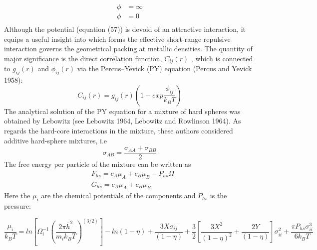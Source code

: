 \documentclass[12pt]{article}
\newcommand*{\1}{\hspace{1pt}}
\begin{document}
\begin{align}
        \phi & = \infty \tag*{($r<0$)}\\
        \phi & = 0  \tag*{($r>0$)}\\       
\end{align}
Although the potential (equation (57)) is devoid of an attractive interaction, it equips a 
useful insight into which forms the effective short-range repulsive interaction governs the 
geometrical packing at metallic densities. The quantity of major significance is the direct
correlation function, $C_{ij}(r)$ , which is connected to $g_{ij}(r)$ and $\phi_{ij}(r)$ via the Percus–Yevick
(PY) equation (Percus and Yevick 1958):
    \begin{equation}
        C_{ij}(r) = g_{ij}(r)\left(1 - exp\frac{\phi_{ij}}{k_{B}T}\right)          \tag*{(i , j = A , B)}
    \end{equation}
The analytical solution of the PY equation for a mixture of hard spheres was obtained by 
Lebowitz (see Lebowitz 1964, Lebowitz and Rowlinson 1964). As regards the hard-core 
interactions in the mixture, these authors considered additive hard-sphere mixtures, i.e
    \begin{equation}
        \sigma_{AB} = \frac{\sigma_{AA} + \sigma_{BB} }{2}
    \end{equation}
The free energy per particle of the mixture can be written as
\begin{align}
    &  F_{hs} = c_{A}\mu_{A} + c_{B}\mu_{B} - P _{hs}\Omega \\
    &  G_{hs} = c_{A}\mu_{A} + c_{B}\mu_{B}
    \end{align}
Here the $\mu_i$ are the chemical potentials of the components and $P _{hs}$ is the pressure:

    \begin{equation}
        \frac{\mu_i}{k_{B}T} = ln \left[\Omega ^{-1}_{i}\left(\frac{2\pi \overline{h}^2}
        {m_{i}k_{B}T}\right)^(3/2)\right] - ln (1 - \eta) + \frac{3X\sigma_{ij}}{(1 - 
        \eta)} + \frac{3}{2}\left[\frac{3X^2}{(1 - \eta )^2} + \frac{2Y}{(1 - \eta)}\right] 
        \sigma^2_{ii} + \frac{\pi P _{hs}\sigma^3_{ii}}{6k_{B}T}
    \end{equation}
\end{document}
